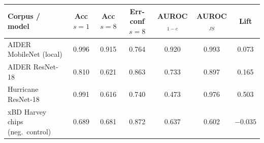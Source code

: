 \begin{tabular}{lcccccc}
\toprule
Corpus / model & Acc $s{=}1$ & Acc $s{=}8$ & Err-conf $s{=}8$ & AUROC$_{1-c}$ & AUROC$_{JS}$ & Lift \\
\midrule
AIDER MobileNet (local) & 0.996 & 0.915 & 0.764 & 0.920 & 0.993 & 0.073 \\
AIDER ResNet-18 & 0.810 & 0.621 & 0.863 & 0.733 & 0.897 & 0.165 \\
Hurricane ResNet-18 & 0.991 & 0.616 & 0.740 & 0.473 & 0.976 & 0.503 \\
xBD Harvey chips (neg.\ control) & 0.689 & 0.681 & 0.872 & 0.637 & 0.602 & $-0.035$ \\
\bottomrule
\end{tabular}

